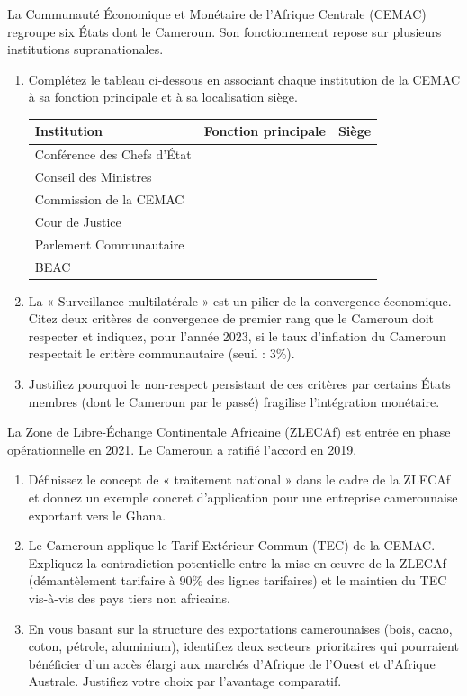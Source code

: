 \documentclass[11pt]{article}
\begin{document}
\begin{exercice}
La Communauté Économique et Monétaire de l'Afrique Centrale (CEMAC) regroupe six États dont le Cameroun. Son fonctionnement repose sur plusieurs institutions supranationales.
\begin{enumerate}
    \item Complétez le tableau ci-dessous en associant chaque institution de la CEMAC à sa fonction principale et à sa localisation siège.
    \begin{tabularx}{\linewidth}{|X|X|X|}
    \hline
    \textbf{Institution} & \textbf{Fonction principale} & \textbf{Siège} \\ \hline
    Conférence des Chefs d'État &  &  \\ \hline
    Conseil des Ministres &  &  \\ \hline
    Commission de la CEMAC &  &  \\ \hline
    Cour de Justice &  &  \\ \hline
    Parlement Communautaire &  &  \\ \hline
    BEAC &  &  \\ \hline
    \end{tabularx}
    \item La « Surveillance multilatérale » est un pilier de la convergence économique. Citez deux critères de convergence de premier rang que le Cameroun doit respecter et indiquez, pour l'année 2023, si le taux d'inflation du Cameroun respectait le critère communautaire (seuil : 3\%).
    \item Justifiez pourquoi le non-respect persistant de ces critères par certains États membres (dont le Cameroun par le passé) fragilise l'intégration monétaire.
\end{enumerate}
\end{exercice}

\begin{exercice}
La Zone de Libre-Échange Continentale Africaine (ZLECAf) est entrée en phase opérationnelle en 2021. Le Cameroun a ratifié l'accord en 2019.
\begin{enumerate}
    \item Définissez le concept de « traitement national » dans le cadre de la ZLECAf et donnez un exemple concret d'application pour une entreprise camerounaise exportant vers le Ghana.
    \item Le Cameroun applique le Tarif Extérieur Commun (TEC) de la CEMAC. Expliquez la contradiction potentielle entre la mise en œuvre de la ZLECAf (démantèlement tarifaire à 90\% des lignes tarifaires) et le maintien du TEC vis-à-vis des pays tiers non africains.
    \item En vous basant sur la structure des exportations camerounaises (bois, cacao, coton, pétrole, aluminium), identifiez deux secteurs prioritaires qui pourraient bénéficier d'un accès élargi aux marchés d'Afrique de l'Ouest et d'Afrique Australe. Justifiez votre choix par l'avantage comparatif.
\end{enumerate}
\end{exercice}
\end{document}
